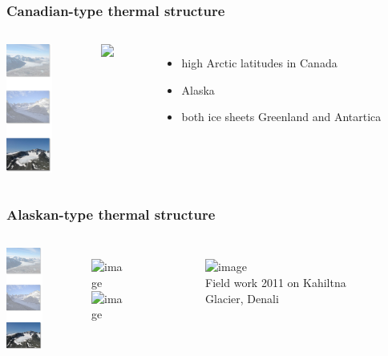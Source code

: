 \documentclass[hide notes,intlimits]{beamer}
\begin{document}
\begin{frame}
 \frametitle{Canadian-type thermal structure}
  \begin{columns}
    \column[T]{1.75cm} 
    \vspace{1cm}
    {\includegraphics[width=1.5cm]{figures/glaciersv_p}}%
    \vspace{2.5cm}
    \column[T]{10.25cm}
    \begin{figure}
      \includegraphics<1>[width=10cm]{figures/CTSstructures-2land}
    \end{figure}
    \begin{itemize}
    \item high Arctic latitudes in Canada
    \item Alaska
    \item both ice sheets Greenland and Antartica
    \end{itemize}
  \end{columns}
\end{frame}


\begin{frame}
 \frametitle{Alaskan-type thermal structure}
  \begin{columns}
    \column[T]{1.75cm} 
    \vspace{1cm}
    {\includegraphics[width=1.5cm]{figures/glaciersv_p}}%
    \vspace{2.5cm}
    \column[T]{5cm}
    \begin{figure}
      \includegraphics<1>[height=3cm]{figures/alessio_radar}
    \\
     \includegraphics<1>[width=4cm]{figures/Kah_CSL_100MHZ}
   \end{figure}
    \column[T]{5cm}
    \begin{figure}
    \includegraphics<1>[height=3cm]{figures/kahiltna_group}
     \\[2em]
    Field work 2011 on Kahiltna Glacier, Denali
    \end{figure}
 \end{columns}
\end{frame}
\end{document}
